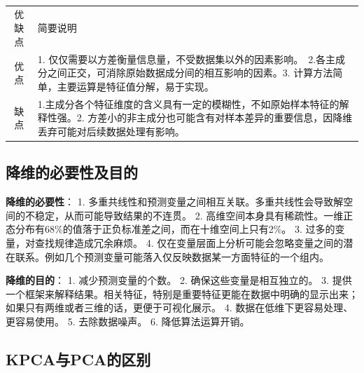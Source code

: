 \begin{longtable}[]{ cl }
\begin{minipage}[b]{0.05\columnwidth}\centering\strut
优缺点\strut
\end{minipage} & \begin{minipage}[b]{0.04\columnwidth}\raggedright\strut
简要说明\strut
\end{minipage}\tabularnewline
\begin{minipage}[t]{0.05\columnwidth}\centering\strut
优点\strut
\end{minipage} & \begin{minipage}[t]{0.04\columnwidth}\raggedright\strut
1.
仅仅需要以方差衡量信息量，不受数据集以外的因素影响。　2.各主成分之间正交，可消除原始数据成分间的相互影响的因素。3.
计算方法简单，主要运算是特征值分解，易于实现。\strut
\end{minipage}\tabularnewline
\begin{minipage}[t]{0.05\columnwidth}\centering\strut
缺点\strut
\end{minipage} & \begin{minipage}[t]{0.04\columnwidth}\raggedright\strut
1.主成分各个特征维度的含义具有一定的模糊性，不如原始样本特征的解释性强。2.
方差小的非主成分也可能含有对样本差异的重要信息，因降维丢弃可能对后续数据处理有影响。\strut
\end{minipage}\tabularnewline
\end{longtable}

\subsection{降维的必要性及目的}\label{ux964dux7ef4ux7684ux5fc5ux8981ux6027ux53caux76eeux7684}

\textbf{降维的必要性}： 1.
多重共线性和预测变量之间相互关联。多重共线性会导致解空间的不稳定，从而可能导致结果的不连贯。
2.
高维空间本身具有稀疏性。一维正态分布有68\%的值落于正负标准差之间，而在十维空间上只有2\%。
3. 过多的变量，对查找规律造成冗余麻烦。 4.
仅在变量层面上分析可能会忽略变量之间的潜在联系。例如几个预测变量可能落入仅反映数据某一方面特征的一个组内。

\textbf{降维的目的}： 1. 减少预测变量的个数。 2.
确保这些变量是相互独立的。 3.
提供一个框架来解释结果。相关特征，特别是重要特征更能在数据中明确的显示出来；如果只有两维或者三维的话，更便于可视化展示。
4. 数据在低维下更容易处理、更容易使用。 5. 去除数据噪声。 6.
降低算法运算开销。

\subsection{KPCA与PCA的区别}\label{kpcaux4e0epcaux7684ux533aux522b}

